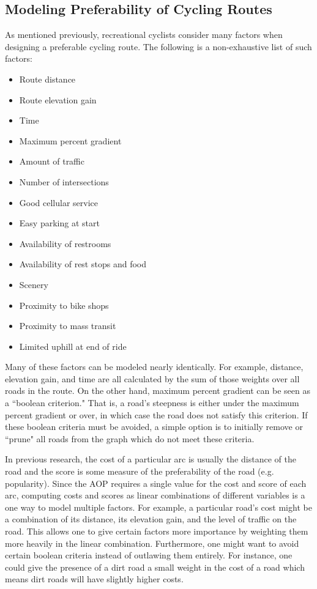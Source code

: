 \documentclass[11pt]{article}
\begin{document}
\subsection{Modeling Preferability of Cycling Routes} \label{routefactors}
As mentioned previously, recreational cyclists consider many factors when designing a preferable cycling route. The following is a non-exhaustive list of such factors:

\begin{multicols}{2}
\begin{itemize}
    \item Route distance
    \item Route elevation gain
    \item Time
    \item Maximum percent gradient
    \item Amount of traffic
    \item Number of intersections
    \item Good cellular service
    \item Easy parking at start
    \item Availability of restrooms
    \item Availability of rest stops and food
    \item Scenery
    \item Proximity to bike shops
    \item Proximity to mass transit
    \item Limited uphill at end of ride
\end{itemize}    
\end{multicols}

Many of these factors can be modeled nearly identically. For example, distance, elevation gain, and time are all calculated by the sum of those weights over all roads in the route. On the other hand, maximum percent gradient can be seen as a ``boolean criterion." That is, a road's steepness is either under the maximum percent gradient or over, in which case the road does not satisfy this criterion. If these boolean criteria must be avoided, a simple option is to initially remove or ``prune" all roads from the graph which do not meet these criteria.

In previous research, the cost of a particular arc is usually the distance of the  road and the score is some measure of the preferability of the road (e.g. popularity). Since the AOP requires a single value for the cost and score of each arc, computing costs and scores as linear combinations of different variables is a one way to model multiple factors. For example, a particular road's cost might be a combination of its distance, its elevation gain, and the level of traffic on the road. This allows one to give certain factors more importance by weighting them more heavily in the linear combination. Furthermore, one might want to avoid certain boolean criteria instead of outlawing them entirely. For instance, one could give the presence of a dirt road a small weight in the cost of a road which means dirt roads will have slightly higher costs.
\end{document}
